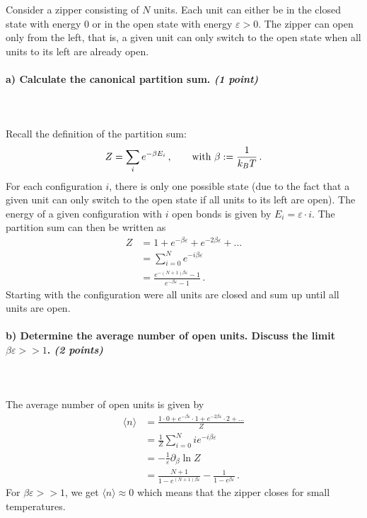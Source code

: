 Consider a zipper consisting of $N$ units. Each unit can either be in the 
closed state with energy 0 or in the open state with energy $\varepsilon>0$.
The zipper can open only from the left, that is, a given unit can only switch
to the open state when all units to its left are already open.

\paragraph{a) Calculate the canonical partition sum. \textit{(1 point)}} \ \\
    \\
    Recall the definition of the partition sum:
    \begin{equation}
        Z=\sum_i e^{-\beta E_i}
        \,, \ \ \ \ \ \ \textnormal{with }
        \beta:=\frac{1}{k_BT} \,.
    \end{equation}
    For each configuration $i$, there is only one possible state 
    (due to the fact that a given unit can only switch to the open state if 
    all units to its left are open). The energy of a given configuration
    with $i$ open bonds is given by $E_i=\varepsilon\cdot i$. The 
    partition sum can then be written as
    \begin{align}
        Z
        &=1+e^{-\beta\varepsilon}+e^{-2\beta\varepsilon}+... \\
        &=\sum_{i=0}^N e^{-i\beta\varepsilon} \\
        &=\frac{e^{-(N+1)\beta\varepsilon} - 1}{e^{-\beta\varepsilon} - 1} \,.
    \end{align}
    Starting with the configuration were all units are closed and sum up until all units
    are open.

\paragraph{b) Determine the average number of open units. Discuss the limit 
    $\beta\varepsilon>>1$. \textit{(2 points)}} \ \\
    \\
    The average number of open units is given by
    \begin{align}
        \langle n\rangle 
        &=\frac{1\cdot 0+e^{-\beta\varepsilon}\cdot 
        1+e^{-2\beta\varepsilon}\cdot 2+...}{Z} \\
        &=\frac{1}{Z} \sum_{i=0}^N i e^{-i\beta\varepsilon} \\
        &=-\frac{1}{\varepsilon} \partial_{\beta} \ln Z \\
        &=\frac{N+1}{1-e^{(N+1)\beta\varepsilon}} - \frac{1}{1-e^{\beta\varepsilon}} \,.
    \end{align}
    For $\beta\varepsilon>>1$, we get $\langle n\rangle \approx 0$ which means that the 
    zipper closes for small temperatures.

 
